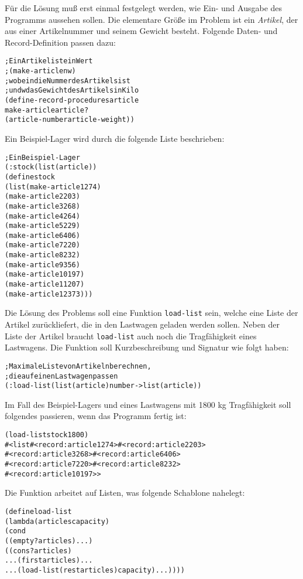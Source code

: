 Für die Lösung muß erst einmal festgelegt werden, wie Ein- und Ausgabe
des Programms aussehen sollen.  Die elementare Größe im Problem ist
ein \textit{Artikel}, der aus einer Artikelnummer und seinem Gewicht
besteht.  Folgende Daten- und Record-Definition passen dazu:
%
\begin{alltt}
; Ein Artikel ist ein Wert
;  (make-article n w)
; wobei n die Nummer des Artikels ist
; und w das Gewicht des Artikels in Kilo
(define-record-procedures article
  make-article article?
  (article-number article-weight))
\end{alltt}
%
Ein Beispiel-Lager wird durch die folgende
Liste beschrieben:
%
\begin{alltt}
; Ein Beispiel-Lager
(: stock (list(article))
(define stock
  (list (make-article 1 274)
        (make-article 2 203)
        (make-article 3 268)
        (make-article 4 264)
        (make-article 5 229)
        (make-article 6 406)
        (make-article 7 220)
        (make-article 8 232)
        (make-article 9 356)
        (make-article 10 197)
        (make-article 11 207)
        (make-article 12 373)))
\end{alltt}
%
Die Lösung des Problems soll eine Funktion \texttt{load-list}
sein, welche eine Liste der Artikel zurückliefert, die in den Lastwagen geladen
werden sollen.  Neben der Liste der Artikel braucht
\texttt{load-list} auch noch die Tragfähigkeit eines Lastwagens.  Die
Funktion soll Kurzbeschreibung und Signatur wie folgt haben:
%
\begin{alltt}
; Maximale Liste von Artikeln berechnen, 
; die auf einen Lastwagen passen
(: load-list (list(article) number -> list(article))
\end{alltt}
%
Im Fall des Beispiel-Lagers und eines Lastwagens mit 1800 kg Tragfähigkeit
soll folgendes
passieren, wenn das Programm fertig ist:
%
\begin{alltt}
(load-list stock 1800)
\evalsto{} #<list #<record:article 1 274> #<record:article 2 203>
          #<record:article 3 268> #<record:article 6 406>
          #<record:article 7 220> #<record:article 8 232> 
          #<record:article 10 197>>
\end{alltt}
%
Die Funktion arbeitet auf Listen, was folgende Schablone nahelegt:
%
\begin{alltt}
(define load-list
  (lambda (articles capacity)
    (cond
     ((empty? articles) ...)
     ((cons? articles)
      ... (first articles) ...
      ... (load-list (rest articles) capacity) ...))))
\end{alltt}
